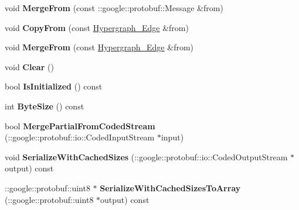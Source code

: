 \begin{DoxyCompactItemize}
\item 
\hypertarget{classHypergraph__Edge_a10b898c3321b1dc37977b452ac8e6f0e}{
void {\bfseries MergeFrom} (const ::google::protobuf::Message \&from)}
\label{classHypergraph__Edge_a10b898c3321b1dc37977b452ac8e6f0e}

\item 
\hypertarget{classHypergraph__Edge_a63ed56813c060988bc61a35ea30d216e}{
void {\bfseries CopyFrom} (const \hyperlink{classHypergraph__Edge}{Hypergraph\_\-Edge} \&from)}
\label{classHypergraph__Edge_a63ed56813c060988bc61a35ea30d216e}

\item 
\hypertarget{classHypergraph__Edge_a193be9b1c77ac3c955bedfd14581b88a}{
void {\bfseries MergeFrom} (const \hyperlink{classHypergraph__Edge}{Hypergraph\_\-Edge} \&from)}
\label{classHypergraph__Edge_a193be9b1c77ac3c955bedfd14581b88a}

\item 
\hypertarget{classHypergraph__Edge_a111b4c380a219239ea99a0803b1160b9}{
void {\bfseries Clear} ()}
\label{classHypergraph__Edge_a111b4c380a219239ea99a0803b1160b9}

\item 
\hypertarget{classHypergraph__Edge_a635fda95ae632d07889b53588d4352bc}{
bool {\bfseries IsInitialized} () const }
\label{classHypergraph__Edge_a635fda95ae632d07889b53588d4352bc}

\item 
\hypertarget{classHypergraph__Edge_a98114bd535825d90c7e28499f957c0f4}{
int {\bfseries ByteSize} () const }
\label{classHypergraph__Edge_a98114bd535825d90c7e28499f957c0f4}

\item 
\hypertarget{classHypergraph__Edge_aef6ab2097154d0ac22d50d0159f5610a}{
bool {\bfseries MergePartialFromCodedStream} (::google::protobuf::io::CodedInputStream $\ast$input)}
\label{classHypergraph__Edge_aef6ab2097154d0ac22d50d0159f5610a}

\item 
\hypertarget{classHypergraph__Edge_ac3aba45b607957f38bc9cc9eab5ef614}{
void {\bfseries SerializeWithCachedSizes} (::google::protobuf::io::CodedOutputStream $\ast$output) const }
\label{classHypergraph__Edge_ac3aba45b607957f38bc9cc9eab5ef614}

\item 
\hypertarget{classHypergraph__Edge_ae571e4f1004a66a0f3cb54a0fbf04608}{
::google::protobuf::uint8 $\ast$ {\bfseries SerializeWithCachedSizesToArray} (::google::protobuf::uint8 $\ast$output) const }
\label{classHypergraph__Edge_ae571e4f1004a66a0f3cb54a0fbf04608}


\end{DoxyCompactItemize}
